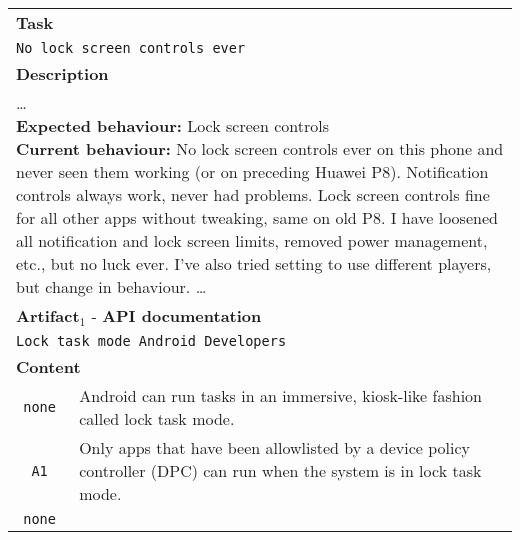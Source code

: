\begin{landscape}
\begin{table}
\begin{scriptsize}
\begin{tabular}{cl}
\multicolumn{2}{l}{\cellcolor{lightgray}
    \textbf{Task}
}
\\
\multicolumn{2}{l}{\hspace{3mm}
\parbox[l][0.7cm][c]{16cm}{
    \texttt{No lock screen controls ever
}}}
\href{https://github.com/AntennaPod/AntennaPod/issues/3578}{link}
\\
\multicolumn{2}{l}{\cellcolor{lightgray}
    \textbf{Description}
}
\\
\multicolumn{2}{l}{
\hspace{3mm}
\parbox[l][2.5cm][c]{21cm}{
{\ttfamily
    \ldots
    \\
    \textbf{Expected behaviour:} Lock screen controls
    \\
    \textbf{Current behaviour:} No lock screen controls ever on this phone and never seen them working (or on preceding Huawei P8). Notification controls always work, never had problems. Lock screen controls fine for all other apps without tweaking, same on old P8. I have loosened all notification and lock screen limits, removed power management, etc., but no luck ever. I've also tried setting to use different players, but change in behaviour. \ldots
}}}
\\
\hline
\hline
\multicolumn{2}{l}{\cellcolor{lightgray}
    \textbf{Artifact}$_1$ - \textbf{API documentation}}
\\
\multicolumn{2}{l}{\hspace{3mm}
\parbox[l][0.7cm][c]{16cm}{
    \texttt{Lock task mode Android Developers
}}}
\href{https://developer.android.com/work/dpc/dedicated-devices/lock-task-mode}{link}
\\
\multicolumn{2}{l}{\cellcolor{lightgray}
    \textbf{Content}}
\\
\texttt{none} & 
\parbox[l][0.6cm][c]{20cm}{
{\ttfamily    
    Android can run tasks in an immersive, kiosk-like fashion called lock task mode.
}}
\\
\texttt{A1} & 
\parbox[l][0.6cm][c]{20cm}{
{\ttfamily    
    Only apps that have been allowlisted by a device policy controller (DPC) can run when the system is in lock task mode.
}} 
\\
\texttt{none} & 

\end{tabular}
\end{scriptsize}
\end{table}
\end{landscape}
